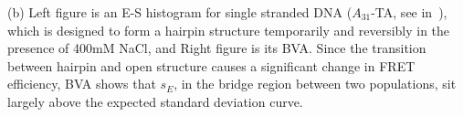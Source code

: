 (b) Left figure is an E-S histogram for single stranded DNA ($A_{31}$-TA, see in~\cite{Tsukanov_2013}), which is designed to form a hairpin structure temporarily and reversibly in the presence of 400mM NaCl, and Right figure is its BVA. Since the transition between hairpin and open structure causes a significant change in FRET efficiency, BVA shows that $s_E$, in the bridge region between two populations, sit largely above the expected standard deviation curve.
